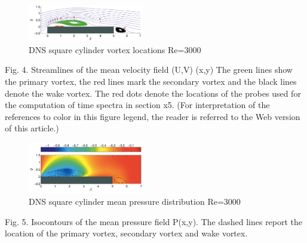 \documentclass[journal]{new-aiaa}
\begin{document}
\begin{figure}[H]
\begin{center}
\includegraphics[width=0.45\textwidth]{Images/logan/cimarelli2018direct_vortices.pdf}
\caption{ DNS square cylinder vortex locations Re=3000 \cite{cimarelli2018direct} }
\label{fig:dnsRectCylVortices}
\end{center}
\end{figure}


Fig. 4. Streamlines of the mean velocity field (U,V) (x,y)  The green lines show the primary vortex, the red lines mark the secondary vortex and the black lines denote the wake vortex. The red dots denote the locations of the probes used for the computation of time spectra in section x5. (For interpretation of the references to color in this figure legend, the reader is referred to the Web version of this article.)

\begin{figure}[H]
\begin{center}
\includegraphics[width=0.45\textwidth]{Images/logan/cimarelli2018direct_pressure.pdf}
\caption{ DNS square cylinder mean pressure distribution Re=3000 \cite{cimarelli2018direct} }
\label{fig:dnsRectCylPressure}
\end{center}
\end{figure}

Fig. 5. Isocontours of the mean pressure field P(x,y). The dashed lines report the location of the primary vortex, secondary vortex and wake vortex.
\end{document}
